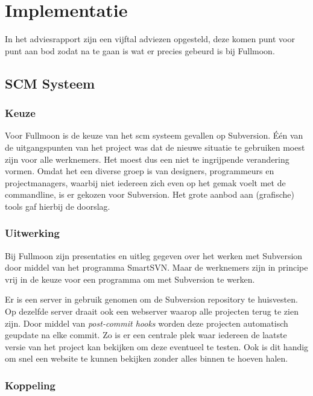 \chapter{Implementatie}

In het adviesrapport zijn een vijftal adviezen opgesteld, deze komen punt voor punt aan bod zodat na te gaan is wat er precies gebeurd is bij Fullmoon.

\section{SCM Systeem}

\subsection{Keuze}

Voor Fullmoon is de keuze van het {\sc scm} systeem gevallen op Subversion. Één van de uitgangspunten van het project was dat de nieuwe situatie te gebruiken moest zijn voor alle werknemers. Het moest dus een niet te ingrijpende verandering vormen. Omdat het een diverse groep is van designers, programmeurs en projectmanagers, waarbij niet iedereen zich even op het gemak voelt met de commandline, is er gekozen voor Subversion. Het grote aanbod aan (grafische) tools gaf hierbij de doorslag.

\subsection{Uitwerking}

Bij Fullmoon zijn presentaties en uitleg gegeven over het werken met Subversion door middel van het programma SmartSVN. Maar de werknemers zijn in principe vrij in de keuze voor een programma om met Subversion te werken.

Er is een server in gebruik genomen om de Subversion repository te huisvesten. Op dezelfde server draait ook een webserver waarop alle projecten terug te zien zijn. Door middel van \emph{post-commit hooks} worden deze projecten automatisch geupdate na elke commit. Zo is er een centrale plek waar iedereen de laatste versie van het project kan bekijken om deze eventueel te testen. Ook is dit handig om snel een website te kunnen bekijken zonder alles binnen te hoeven halen.

\subsection{Koppeling}

